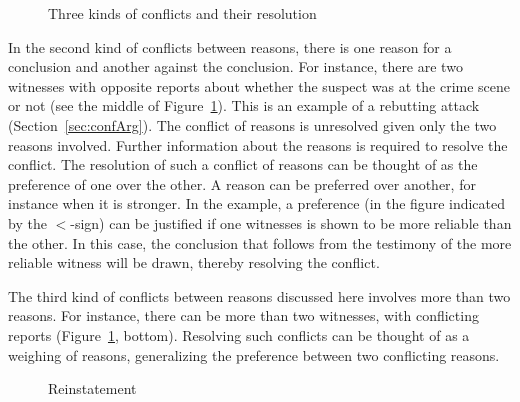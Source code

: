 \documentclass[10pt]{article}
\begin{document}

\begin{figure}[bt]
\centering

\caption{Three kinds of conflicts and their resolution\label{fig:conflicts}}
\end{figure}

In the second kind of conflicts between reasons, there is one reason for a conclusion and another against the conclusion. For instance, there are two witnesses with opposite reports about whether the suspect was at the crime scene or not (see the middle of Figure~\ref{fig:conflicts}). This is an example of a rebutting attack (Section~\ref{sec:confArg}). The conflict of reasons is unresolved given only the two reasons involved. Further information about the reasons is required to resolve the conflict. The resolution of such a conflict of reasons can be thought of as the preference of one over the other. A reason can be preferred over another, for instance when it is stronger. In the example, a preference (in the figure indicated by the $<$-sign) can be justified if one witnesses is shown to be more reliable than the other. In this case, the conclusion that follows from the testimony of the more reliable witness will be drawn, thereby resolving the conflict. 

The third kind of conflicts between reasons discussed here involves more than two reasons. For instance, there can be more than two witnesses, with conflicting reports (Figure~\ref{fig:conflicts}, bottom). %
Resolving such conflicts can be thought of as a weighing of reasons, generalizing the preference between two conflicting reasons. 





\begin{figure}[bt]
\centering

\caption{Reinstatement\label{fig:reinstatement}}
\end{figure}
\end{document}
